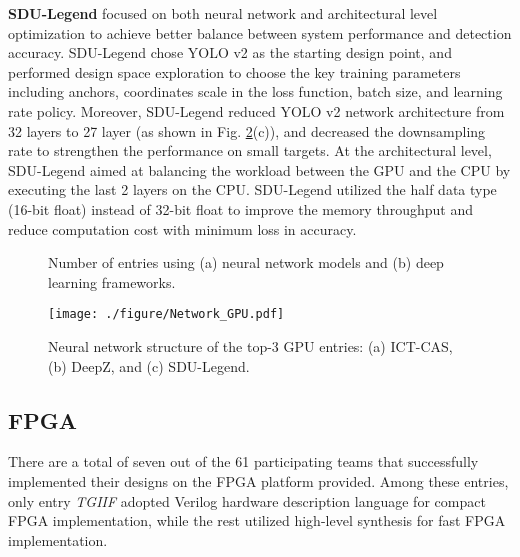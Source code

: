 \documentclass[10pt,journal,compsoc]{IEEEtran}
\begin{document}
\textbf{SDU-Legend} focused on both neural network and architectural level optimization to achieve better balance between system performance and detection accuracy.
SDU-Legend chose YOLO v2 as the starting design point, and performed design space exploration to choose the key training parameters including anchors, coordinates scale in the loss function, batch size, and learning rate policy.
Moreover, SDU-Legend reduced YOLO v2 network architecture from 32 layers to 27 layer (as shown in Fig. \ref{fig:Network_GPU}(c)), and decreased the downsampling rate to strengthen the performance on small targets.
At the architectural level, SDU-Legend aimed at balancing the workload between the GPU and the CPU by executing the last 2 layers on the CPU.
SDU-Legend utilized the half data type (16-bit float) instead of 32-bit float to improve the memory throughput and reduce computation cost with minimum loss in accuracy. %




\begin{figure}
\centering
{}
\vspace{-5pt}
\caption{Number of entries using (a) neural network models and (b) deep learning frameworks.}
\label{fig:gpu_summary}
\vspace{-15pt}
\end{figure}

\begin{figure}
\centering
  \texttt{[image: ./figure/Network\_GPU.pdf]}
  \caption{Neural network structure of the top-3 GPU entries: (a) ICT-CAS, (b) DeepZ, and (c) SDU-Legend.}
  \label{fig:Network_GPU}
\end{figure}



\subsection{FPGA}


There are a total of seven out of the 61 participating teams that successfully implemented their designs on the FPGA platform provided.
Among these entries, only entry \emph{{TGIIF}} adopted Verilog hardware description language for compact FPGA implementation, while the rest utilized high-level synthesis for fast FPGA implementation.
\end{document}
